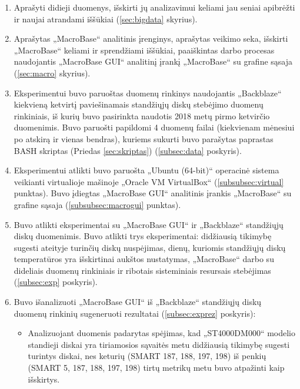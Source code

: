 \documentclass{VUMIFPSkursinis}
\begin{document}
\begin{enumerate}
\item Aprašyti didieji duomenys, išskirti jų analizavimui keliami jau seniai apibrėžti ir naujai atrandami iššūkiai (\ref{sec:bigdata} skyrius).

\item Aprašytas „MacroBase“ analitinis įrenginys, aprašytas veikimo seka, išskirti „MacroBase“ keliami ir sprendžiami iššūkiai, paaiškintas darbo procesas naudojantis „MacroBase GUI“ analitinį įrankį „MacroBase“ su grafine sąsaja (\ref{sec:macro} skyrius).

\item Eksperimentui buvo paruoštas duomenų rinkinys naudojantis „Backblaze“ kiekvieną ketvirtį paviešinamais standžiųjų diskų stebėjimo duomenų rinkiniais, iš kurių buvo pasirinkta naudotis 2018 metų pirmo ketvirčio duomenimis. Buvo paruošti papildomi 4 duomenų failai (kiekvienam mėnesiui po atskirą ir vienas bendras), kuriems sukurti buvo parašytas paprastas BASH skriptas (Priedas \ref{sec:skriptas}) (\ref{subsec:data} poskyris).

\item Eksperimentui atlikti buvo paruošta „Ubuntu (64-bit)“ operacinė sistema veikianti virtualioje mašinoje „Oracle VM VirtualBox“ (\ref{subsubsec:virtual} punktas). Buvo įdiegtas „MacroBase GUI“ analitinis įrankis „MacroBase“ su grafine sąsaja (\ref{subsubsec:macrogui} punktas).

\item Buvo atlikti eksperimentai su „MacroBase GUI“ ir „Backblaze“ standžiųjų diskų duomenimis. Buvo atlikti trys eksperimentai: didžiausią tikimybę sugesti ateityje turinčių diskų nuspėjimas, dienų, kuriomis standžiųjų diskų temperatūros yra išskirtinai aukštos nustatymas, „MacroBase“ darbo su dideliais duomenų rinkiniais ir ribotais sisteminiais resursais stebėjimas (\ref{subsec:exp} poskyris).

\item Buvo išanalizuoti „MacroBase GUI“ iš „Backblaze“ standžiųjų diskų duomenų rinkinių sugeneruoti rezultatai (\ref{subsec:exprez} poskyris):

\begin{itemize}
\item Analizuojant duomenis padarytas spėjimas, kad „ST4000DM000“ modelio standieji diskai yra  tiriamosios sąvaitės metu didžiausią tikimybę sugesti turintys diskai, nes keturių (SMART 187, 188, 197, 198) iš penkių (SMART 5, 187, 188, 197, 198) tirtų metrikų metu buvo atpažinti kaip išskirtys.


\end{itemize}
\end{enumerate}
\end{document}
